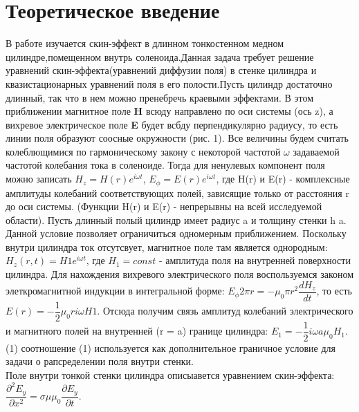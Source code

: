 \documentclass{article}
\begin{document}
\section{Теоретическое введение}
В работе изучается скин-эффект в длинном тонкостенном медном цилиндре,помещенном внутрь соленоида.Данная задача требует решение уравнений скин-эффекта(уравнений диффузии поля) в стенке цилиндра и квазистационарных уравнений поля в его полости.\newline Пусть цилиндр достаточно длинный, так что в нем можно пренебречь краевыми эффектами. В этом приближении магнитное поле \textbf{H} всюду направлено по оси системы (ось z), а вихревое электрическое поле \textbf{E} будет всбду перпендикулярно радиусу, то есть линии поля образуют соосные окружности (рис. 1). Все величины будем считать колеблющимися по гармоническому закону с некоторой частотой $\omega$ задаваемой частотой колебания тока в соленоиде. Тогда для ненулевых компонент поля можно записать
\newline $ H_z = H(r) e^{i\omega t} $, $E_\phi = E(r) e^{i\omega t}$, где H(r) и E(r) - комплексные амплитуды колебаний соответствующих полей, зависящие только от расстояния r до оси системы. (Функции H(r) и E(r) - непрерывны на всей исследуемой области). 
\newline Пусть длинный полый цилиндр имеет радиус a и толщину стенки h \ll a. Данной условие позволяет ограничиться одномерным приближением. 
\newline Поскольку внутри цилиндра ток отсутсвует, магнитное поле там является однородным: $H_z(r, t) = H1e^{i\omega t} $, где $H_1 = const$ - амплитуда поля на внутренней поверхности цилиндра. Для нахождения вихревого электрического поля воспользуемся законом элеткромагнитной индукции в интегральной форме:
\newline $E_\phi 2 \pi r = -\mu_0 \pi r^2 \dfrac{dH_z}{dt}$, то есть $E(r) = -\dfrac{1}{2} \mu_0 r i \omega H1$.
\newline Отсюда получим связь амплитуд колебаний электрического и магнитного полей на внутренней (r = a) границе цилиндра:
\centering $E_1 = -\dfrac{1}{2} i \omega a \mu_0 H_1$. (1)
\newline соотношение (1) используется как дополнительное граничное условие для задачи о рапсределении поля внутри стенки. 
\newline
\\ Поле внутри тонкой стенки цилиндра описыавется уравнением скин-эффекта:
$\dfrac{\partial^2 E_y}{\partial x^2} = \sigma \mu \mu_0 \dfrac{\partial E_y}{\partial t}$. 
\end{document}
